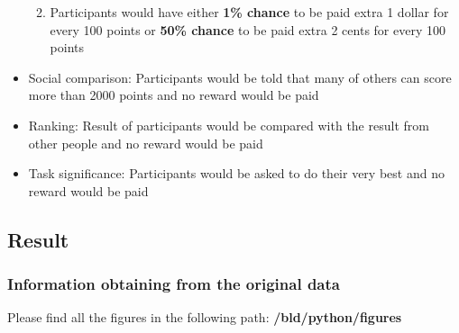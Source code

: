\documentclass[11pt
]{article}
\begin{document}
\begin{itemize}
  \begin{enumerate}
  \def\labelenumi{\arabic{enumi}.}
  \item
    Participants would have either \textbf{1\% chance} to be paid extra
    1 dollar for every 100 points or \textbf{50\% chance} to be paid
    extra 2 cents for every 100 points
  \end{enumerate}
\item
  Social comparison: Participants would be told that many of others can
  score more than 2000 points and no reward would be paid
\item
  Ranking: Result of participants would be compared with the result from
  other people and no reward would be paid
\item
  Task significance: Participants would be asked to do their very best and
  no reward would be paid
\end{itemize}

\hypertarget{result}{%
\subsection{Result}\label{result}}

\hypertarget{information-obtaining-from-the-original-data}{%
\subsubsection{Information obtaining from the original
data}\label{information-obtained-from-the-original-data}}

Please find all the figures in the following path:
\textbf{/bld/python/figures}
\end{document}
